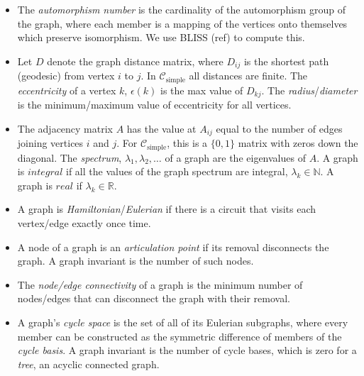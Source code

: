 \documentclass[12pt]{article}
\newcommand{\SIMPLECLASS}{\mathcal{C}_\text{simple}}
\begin{document}
\begin{itemize}
\item The \textit{automorphism number} is the cardinality of the automorphism group of the graph, where each member is a mapping of the vertices onto themselves which preserve isomorphism. We use BLISS (ref) to compute this.

\item Let $D$ denote the graph distance matrix, where $D_{ij}$ is the shortest path (geodesic) from vertex $i$ to $j$.
In $\SIMPLECLASS$ all distances are finite.
The \textit{eccentricity} of a vertex $k$, $\epsilon(k)$ is the max value of $D_{k j}$.
The \textit{radius}/\textit{diameter} is the minimum/maximum value of eccentricity for all vertices.

\item The adjacency matrix $A$ has the value at $A_{ij}$ equal to the number of edges joining vertices $i$ and $j$.
For $\SIMPLECLASS$, this is a $\{0,1\}$ matrix with zeros down the diagonal.
The \textit{spectrum}, $\lambda_1, \lambda_2, \ldots$ of a graph are the eigenvalues of $A$.
A graph is $integral$ if all the values of the graph spectrum are integral, $\lambda_k \in \mathbb{N}$.
A graph is $real$ if $\lambda_k \in \mathbb{R}$.

\item A graph is \textit{Hamiltonian}/\textit{Eulerian} if there is a circuit that visits each vertex/edge exactly once time.



\item A node of a graph is an \textit{articulation point} if its removal disconnects the graph. A graph invariant is the number of such nodes. 

\item The \textit{node/edge connectivity} of a graph is the minimum number of nodes/edges that can disconnect the graph with their removal. 

\item A graph's \textit{cycle space} is the set of all of its Eulerian subgraphs, where every member can be constructed as the symmetric difference of members of the \textit{cycle basis}. A graph invariant is the number of cycle bases, which is zero for a \textit{tree}, an acyclic connected graph.


\end{itemize}
\end{document}
